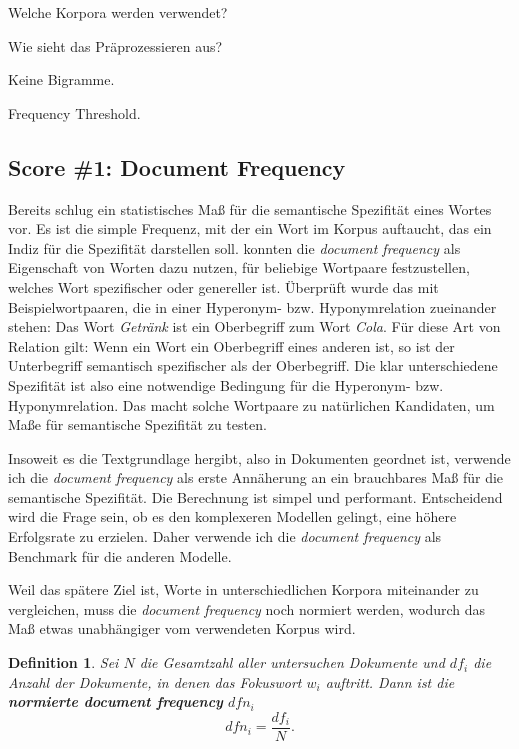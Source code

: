 \documentclass[11pt,numbers=noenddot]{scrartcl}
\newtheorem*{defi}{Definition}
\begin{document}
Welche Korpora werden verwendet?

Wie sieht das Präprozessieren aus?

Keine Bigramme.

Frequency Threshold.

\subsection{Score \#1: Document Frequency}
Bereits \citet{sparckjones1972} schlug ein statistisches Maß für die semantische Spezifität eines Wortes vor. Es ist die simple Frequenz, mit der ein Wort im Korpus auftaucht, das ein Indiz für die Spezifität darstellen soll. \citet{Caraballo99determiningthe} konnten die \emph{document frequency} als Eigenschaft von Worten dazu nutzen, für beliebige Wortpaare festzustellen, welches Wort  spezifischer oder genereller ist. Überprüft wurde das mit Beispielwortpaaren, die in einer Hyperonym- bzw. Hyponymrelation zueinander stehen: Das Wort \emph{Getränk} ist ein Oberbegriff zum Wort \emph{Cola}. Für diese Art von Relation gilt: Wenn ein Wort ein Oberbegriff eines anderen ist, so ist der Unterbegriff semantisch spezifischer als der Oberbegriff. Die klar unterschiedene Spezifität ist also eine notwendige Bedingung für die Hyperonym- bzw. Hyponymrelation. Das macht solche Wortpaare zu natürlichen Kandidaten, um Maße für semantische Spezifität zu testen.

Insoweit es die Textgrundlage hergibt, also in Dokumenten geordnet ist, verwende ich die \emph{document frequency} als erste Annäherung an ein brauchbares Maß für die semantische Spezifität. Die Berechnung ist simpel und performant. Entscheidend wird die Frage sein, ob es den komplexeren Modellen gelingt, eine höhere Erfolgsrate zu erzielen. Daher verwende ich die \emph{document frequency} als Benchmark für die anderen Modelle.

Weil das spätere Ziel ist, Worte in unterschiedlichen Korpora miteinander zu vergleichen, muss die \emph{document frequency} noch normiert werden, wodurch das Maß etwas unabhängiger vom verwendeten Korpus wird.

\begin{defi}
Sei $N$ die Gesamtzahl aller untersuchen Dokumente und $df_i$ die Anzahl der Dokumente, in denen das Fokuswort $w_i$ auftritt. Dann ist die \textbf{normierte document frequency} $dfn_i$
\begin{equation}
    dfn_i = \frac{df_i}{N}.
\end{equation}
\end{defi}
\end{document}
